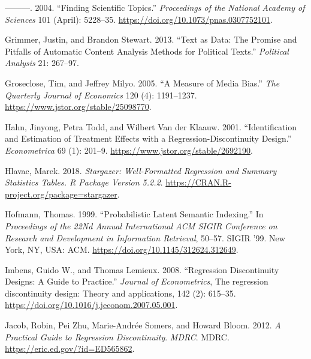 \documentclass[
  12pt,
]{article}
\newlength{\cslhangindent}
\newlength{\cslentryspacingunit} %
\newenvironment{CSLReferences}[2] %
 {%
  \setlength{\parindent}{0pt}
  \ifodd #1
  \let\oldpar\par
  \def\par{\hangindent=\cslhangindent\oldpar}
  \fi
  \setlength{\parskip}{#2\cslentryspacingunit}
 }%
 {}
\begin{document}
\begin{CSLReferences}{1}{0}
\leavevmode{}%
---------. 2004. {``Finding Scientific Topics.''} \emph{Proceedings of
the National Academy of Sciences} 101 (April): 5228--35.
\url{https://doi.org/10.1073/pnas.0307752101}.

\leavevmode{}%
Grimmer, Justin, and Brandon Stewart. 2013. {``Text as {Data}: {The
Promise} and {Pitfalls} of {Automatic Content Analysis Methods} for
{Political Texts}.''} \emph{Political Analysis} 21: 267--97.

\leavevmode{}%
Groseclose, Tim, and Jeffrey Milyo. 2005. {``A {Measure} of {Media
Bias}.''} \emph{The Quarterly Journal of Economics} 120 (4): 1191--1237.
\url{https://www.jstor.org/stable/25098770}.

\leavevmode{}%
Hahn, Jinyong, Petra Todd, and Wilbert Van der Klaauw. 2001.
{``Identification and {Estimation} of {Treatment Effects} with a
{Regression-Discontinuity Design}.''} \emph{Econometrica} 69 (1):
201--9. \url{https://www.jstor.org/stable/2692190}.

\leavevmode{}%
Hlavac, Marek. 2018. \emph{Stargazer: {Well-Formatted Regression} and
{Summary Statistics Tables}. {R} Package Version 5.2.2}.
\url{https://CRAN.R-project.org/package=stargazer}.

\leavevmode{}%
Hofmann, Thomas. 1999. {``Probabilistic {Latent Semantic Indexing}.''}
In \emph{Proceedings of the {22Nd Annual International ACM SIGIR
Conference} on {Research} and {Development} in {Information Retrieval}},
50--57. {SIGIR} '99. {New York, NY, USA}: {ACM}.
\url{https://doi.org/10.1145/312624.312649}.

\leavevmode{}%
Imbens, Guido W., and Thomas Lemieux. 2008. {``Regression Discontinuity
Designs: {A} Guide to Practice.''} \emph{Journal of Econometrics}, The
regression discontinuity design: {Theory} and applications, 142 (2):
615--35. \url{https://doi.org/10.1016/j.jeconom.2007.05.001}.

\leavevmode{}%
Jacob, Robin, Pei Zhu, Marie-Andrée Somers, and Howard Bloom. 2012.
\emph{A {Practical Guide} to {Regression Discontinuity}}. \emph{MDRC}.
{MDRC}. \url{https://eric.ed.gov/?id=ED565862}.


\end{CSLReferences}
\end{document}

